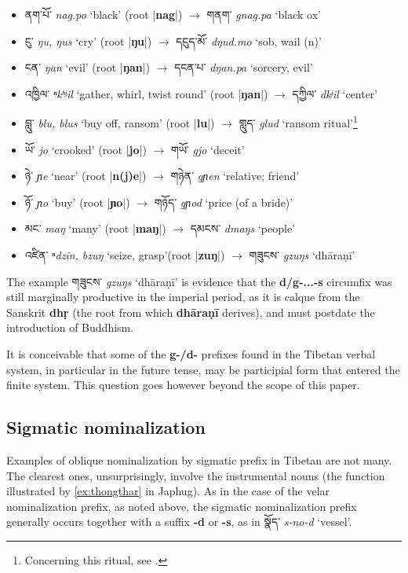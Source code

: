 \documentclass[oneside,a4paper,11pt]{article}
\newcommand{\ipa}[1]{\textbf{{\phon\mbox{#1}}}} %
\newcommand{\tibet}[3]{{\tibetain#1} \textit{\phon#2} `#3'}
\newcommand{\dhat}[1]{|\ipa{#1}|}
\begin{document}
\begin{itemize}
\item \tibet{ནག་པོ་}{nag.po}{black} (root \dhat{nag}) $\rightarrow$	\tibet{གནག་}{gnag.pa}{black ox} 	
\item \tibet{ངུ་}{ŋu, ŋus}{cry} (root \dhat{ŋu}) $\rightarrow$	\tibet{དངུད་མོ་}{dŋud.mo}{sob, wail (n)} 	
\item \tibet{ངན་}{ŋan}{evil} (root \dhat{ŋan}) $\rightarrow$	\tibet{དངན་པ་}{dŋan.pa}{sorcery, evil} 	
\item \tibet{འཁྱིལ་}{ⁿkʰʲil}{gather, whirl, twist round} (root \dhat{ŋan}) $\rightarrow$	\tibet{དཀྱིལ་}{dkʲil}{center}
\item \tibet{བླུ་}{blu, blus}{buy off, ransom} (root \dhat{lu}) $\rightarrow$	\tibet{གླུད་}{glud}{ransom ritual}\footnote{Concerning this ritual, see \citet{karmay91glud}.}
\item \tibet{ཡོ་}{jo}{crooked} (root \dhat{jo}) $\rightarrow$	\tibet{གཡོ་}{gjo}{deceit}
\item \tibet{ཉེ་}{ɲe}{near} (root \dhat{n(j)e}) $\rightarrow$	\tibet{གཉེན་}{gɲen}{relative; friend}
\item \tibet{ཉོ་}{ɲo}{buy} (root \dhat{ɲo}) $\rightarrow$	\tibet{གཉོད་}{gɲod}{price (of a bride)}
\item \tibet{མང་}{maŋ}{many} (root \dhat{maŋ}) $\rightarrow$	\tibet{དམངས་}{dmaŋs}{people}
\item \tibet{འཛིན་}{ⁿdzin, bzuŋ}{seize, grasp}(root \dhat{zuŋ}) $\rightarrow$	\tibet{གཟུངས་}{gzuŋs}{dhāraṇī}
\end{itemize}
 
The example \tibet{གཟུངས་}{gzuŋs}{dhāraṇī} is evidence that the \ipa{d/g-...-s} circumfix was still marginally productive in the imperial period, as it is calque from the Sanskrit \ipa{dhṛ} (the root from which \ipa{dhāraṇī} derives),  and must postdate the introduction of Buddhism.

It is conceivable that some of the \ipa{g-/d-} prefixes found in the Tibetan verbal system, in particular in the future tense, may be participial form that entered the finite system. This question goes however beyond the scope of this paper.

\subsection{Sigmatic nominalization}
Examples of oblique nominalization by sigmatic prefix in Tibetan are not many. The clearest ones, unsurprisingly, involve the instrumental nouns (the function illustrated by \ref{ex:thongthar} in Japhug). As in the case of the velar nominalization prefix, as noted above, the sigmatic nominalization prefix generally occurs together with a suffix \ipa{-d} or \ipa{-s}, as in \tibet{སྣོད་}{s-no-d}{vessel}.
\end{document}
